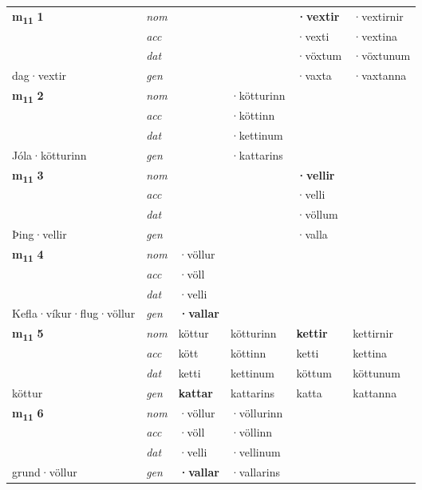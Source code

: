 \begin{longtable}[l]{X>{\footnotesize\itshape}XXXXX}
\multirow{3}{*}{{{\textbf{m{\textsubscript{11}}} \Large{\textbf{1}}}}} & nom &  &  & \textbf{·vextir} & ·vextirnir \\*
 & acc &  &  & ·vexti & ·vextina \\*
 & dat &  &  & ·vöxtum & ·vöxtunum \\*
 {\footnotesize{dag\allowbreak ·vextir}} & gen & \textbf{} &  & ·vaxta & ·vaxtanna \\
\cmidrule{1-6}

\multirow{3}{*}{{{\textbf{m{\textsubscript{11}}} \Large{\textbf{2}}}}} & nom &  & ·kötturinn & \textbf{} &  \\*
 & acc &  & ·köttinn &  &  \\*
 & dat &  & ·kettinum &  &  \\*
 {\footnotesize{Jóla\allowbreak ·kötturinn}} & gen & \textbf{} & ·kattarins &  &  \\
\cmidrule{1-6}

\multirow{3}{*}{{{\textbf{m{\textsubscript{11}}} \Large{\textbf{3}}}}} & nom &  &  & \textbf{·vellir} &  \\*
 & acc &  &  & ·velli &  \\*
 & dat &  &  & ·völlum &  \\*
 {\footnotesize{Þing\allowbreak ·vellir}} & gen & \textbf{} &  & ·valla &  \\
\cmidrule{1-6}

\multirow{3}{*}{{{\textbf{m{\textsubscript{11}}} \Large{\textbf{4}}}}} & nom & ·völlur &  & \textbf{} &  \\*
 & acc & ·völl &  &  &  \\*
 & dat & ·velli &  &  &  \\*
 {\footnotesize{Kefla\allowbreak ·víkur\allowbreak ·flug\allowbreak ·völlur}} & gen & \textbf{·vallar} &  &  &  \\
\cmidrule{1-6}

\multirow{3}{*}{{{\textbf{m{\textsubscript{11}}} \Large{\textbf{5}}}}} & nom & köttur & kötturinn & \textbf{kettir} & kettirnir \\*
 & acc & kött & köttinn & ketti & kettina \\*
 & dat & ketti & kettinum & köttum & köttunum \\*
 {\footnotesize{köttur}} & gen & \textbf{kattar} & kattarins & katta & kattanna \\
\cmidrule{1-6}

\multirow{3}{*}{{{\textbf{m{\textsubscript{11}}} \Large{\textbf{6}}}}} & nom & ·völlur & ·völlurinn & \textbf{} &  \\*
 & acc & ·völl & ·völlinn &  &  \\*
 & dat & ·velli & ·vellinum &  &  \\*
 {\footnotesize{grund\allowbreak ·völlur}} & gen & \textbf{·vallar} & ·vallarins &  &  \\
\cmidrule{1-6}


\end{longtable}
